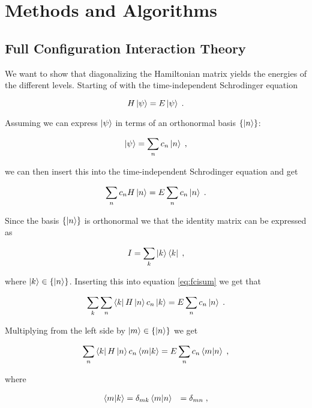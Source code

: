 \section{Methods and Algorithms}
\subsection{Full Configuration Interaction Theory}\label{sec:fci}

We want to show that diagonalizing the Hamiltonian matrix yields the energies of the different levels. Starting of with the time-independent Schrodinger equation

\begin{equation}
    H\ket{\psi} = E \ket{\psi} \; .
\end{equation}

Assuming we can express $\ket{\psi}$ in terms of an orthonormal basis $\left \{ \ket{n} \right \}$:

\begin{equation} \label{eq:psibasis}
    \ket{\psi} = \sum_{n} c_n \ket{n} \; ,
\end{equation}

we can then insert this into the time-independent Schrodinger equation and get

\begin{equation} \label{eq:fcisum}
    \sum_n c_n H \ket{n} = E \sum_n c_n \ket{n} \; .
\end{equation}

Since the basis $\left \{ \ket{n} \right \}$ is orthonormal we that the identity matrix can be expressed as

$$I = \sum_k \ket{k}\bra{k} \; ,$$

where $\ket{k} \in \left \{ \ket{n} \right \}$. Inserting this into equation \ref{eq:fcisum} we get that

\begin{equation}
    \sum_k \sum_n \bra{k} H \ket{n} c_n \ket{k} =  E \sum_n c_n \ket{n} \; . 
\end{equation}

Multiplying from the left side by $\ket{m} \in \left \{ \ket{n} \right \}$ we get

\begin{equation}
   \sum_n \bra{k} H \ket{n} c_n \braket{m}{k} =  E \sum_n c_n \braket{m}{n} \; , 
\end{equation}

where

\begin{align*}
    \braket{m}{k} &= \delta_{mk}
    \braket{m}{n} &= \delta_{mn} \; ,
\end{align*}

